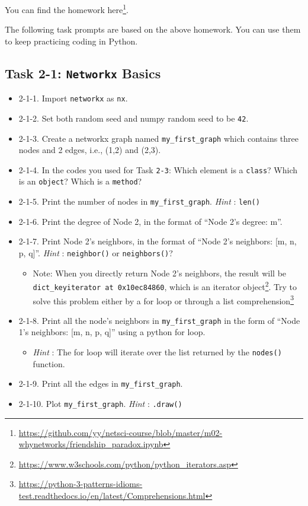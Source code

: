 \documentclass[
]{krantz}
\providecommand{\tightlist}{%
  \setlength{\itemsep}{0pt}\setlength{\parskip}{0pt}}
\renewcommand{\href}[2]{#2\footnote{\url{#1}}}
\begin{document}
You can find the homework \href{https://github.com/yy/netsci-course/blob/master/m02-whynetworks/friendship_paradox.ipynb}{here}.

The following task prompts are based on the above homework. You can use them to keep practicing coding in Python.

\hypertarget{task-2-1-networkx-basics}{%
\subsection{\texorpdfstring{Task 2-1: \texttt{Networkx} Basics}{Task 2-1: Networkx Basics}}\label{task-2-1-networkx-basics}}

\begin{itemize}
\item
  2-1-1. Import \texttt{networkx} as \texttt{nx}.
\item
  2-1-2. Set both random seed and numpy random seed to be \texttt{42}.
\item
  2-1-3. Create a networkx graph named \texttt{my\_first\_graph} which contains three nodes and 2 edges, i.e., (1,2) and (2,3).
\item
  2-1-4. In the codes you used for Task \texttt{2-3}: Which element is a \texttt{class}? Which is an \texttt{object}? Which is a \texttt{method}?
\item
  2-1-5. Print the number of nodes in \texttt{my\_first\_graph}. \emph{Hint} : \texttt{len()}
\item
  2-1-6. Print the degree of Node 2, in the format of ``Node 2's degree: m''.
\item
  2-1-7. Print Node 2's neighbors, in the format of ``Node 2's neighbors: {[}m, n, p, q{]}''. \emph{Hint} : \texttt{neighbor()} or \texttt{neighbors()}?

  \begin{itemize}
  \tightlist
  \item
    Note: When you directly return Node 2's neighbors, the result will be \texttt{dict\_keyiterator\ at\ 0x10ec84860}, which is an \href{https://www.w3schools.com/python/python_iterators.asp}{iterator object}. Try to solve this problem either by a for loop or through a \href{https://python-3-patterns-idioms-test.readthedocs.io/en/latest/Comprehensions.html}{list comprehension}
  \end{itemize}
\item
  2-1-8. Print all the node's neighbors in \texttt{my\_first\_graph} in the form of ``Node 1's neighbors: {[}m, n, p, q{]}'' using a python for loop.

  \begin{itemize}
  \tightlist
  \item
    \emph{Hint} : The for loop will iterate over the list returned by the \texttt{nodes()} function.
  \end{itemize}
\item
  2-1-9. Print all the edges in \texttt{my\_first\_graph}.
\item
  2-1-10. Plot \texttt{my\_first\_graph}. \emph{Hint} : \texttt{.draw()}
\end{itemize}
\end{document}
